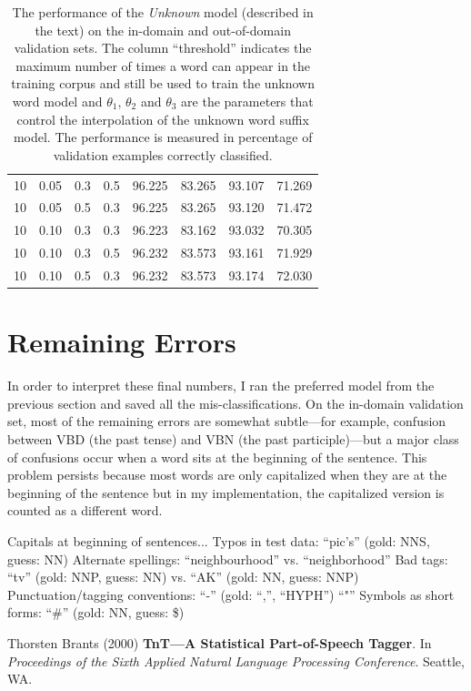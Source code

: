 \documentclass[11pt]{article}
\newcommand{\code}[1]{{\sffamily #1}}
\begin{document}
\begin{table}[phtb]
\begin{center}
\begin{tabular}{c ccc cccc}
10 & 0.05 & 0.3 & 0.5 & 96.225 & 83.265 & 93.107 & 71.269\\
10 & 0.05 & 0.5 & 0.3 & 96.225 & 83.265 & 93.120 & 71.472\\
10 & 0.10 & 0.3 & 0.3 & 96.223 & 83.162 & 93.032 & 70.305\\
10 & 0.10 & 0.3 & 0.5 & 96.232 & 83.573 & 93.161 & 71.929\\
10 & 0.10 & 0.5 & 0.3 & 96.232 & 83.573 & 93.174 & 72.030\\
\bottomrule
\end{tabular}
\end{center}
\caption{%
The performance of the \emph{Unknown} model (described in the text) on the
in-domain and out-of-domain validation sets.
The column ``threshold'' indicates the maximum number of times a word can
appear in the training corpus and still be used to train the unknown word
model and $\theta_1$, $\theta_2$ and $\theta_3$ are the parameters that
control the interpolation of the unknown word suffix model.
The performance is measured in percentage of validation examples correctly
classified.
\label{tab:unknown}}
\end{table}

\section{Remaining Errors}

In order to interpret these final numbers, I ran the preferred model from the
previous section and saved all the mis-classifications.
On the in-domain validation set, most of the remaining errors are somewhat
subtle---for example, confusion between \code{VBD} (the past tense) and
\code{VBN} (the past participle)---but a major class of confusions occur when
a word sits at the beginning of the sentence.
This problem persists because most words are only capitalized when they are at
the beginning of the sentence but in my implementation, the capitalized
version is counted as a different word.

Capitals at beginning of sentences...
Typos in test data: ``pic's'' (gold: NNS, guess: NN)
Alternate spellings: ``neighbourhood'' vs. ``neighborhood''
Bad tags: ``tv'' (gold: NNP, guess: NN) vs. ``AK'' (gold: NN, guess: NNP)
Punctuation/tagging conventions: ``-'' (gold: ``,'', ``HYPH'')
``"''
Symbols as short forms: ``\#'' (gold: NN, guess: \$)

\begin{thebibliography}{}\raggedright

 Thorsten Brants (2000)
\textbf{TnT---A Statistical Part-of-Speech Tagger}.
In \emph{Proceedings of the Sixth Applied Natural Language Processing
Conference}. Seattle, WA.

\end{thebibliography}
\end{document}
